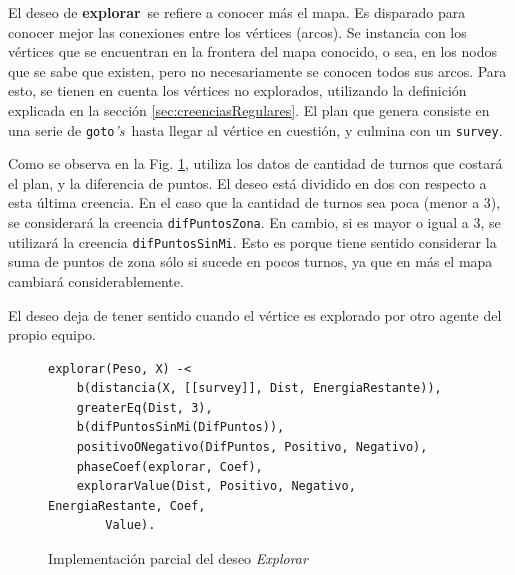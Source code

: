 \documentclass[oneside]{book}
\theoremstyle{definition}
\theoremstyle{example}
\begin{document}
El deseo de \textbf{explorar}\ se refiere a conocer más el mapa. Es disparado para 
conocer mejor las conexiones entre los vértices (arcos). Se instancia con los vértices
que se encuentran en la frontera del mapa conocido, o sea, en los nodos que se sabe
que existen, pero no necesariamente se conocen todos sus arcos. Para esto, se tienen en 
cuenta los vértices no explorados, utilizando la definición explicada en la 
sección \ref{sec:creenciasRegulares}. El plan que genera 
consiste en una serie de \texttt{goto}\textit{'s}\ hasta llegar al vértice en cuestión, y 
culmina con un \texttt{survey}.



Como se observa en la Fig. \ref{fig:deseoExplorar}, utiliza los datos de cantidad de 
turnos que costará el plan, y la diferencia de puntos.
El deseo está dividido en dos con respecto a esta última creencia. En el caso que la
cantidad de turnos sea poca (menor a 3), se considerará la creencia 
\texttt{difPuntosZona}. En cambio, si es mayor o igual a 3, se utilizará la creencia
\texttt{difPuntosSinMi}. Esto es porque tiene sentido considerar la suma de puntos
de zona sólo si sucede en pocos turnos, ya que en más el mapa cambiará 
considerablemente. 

El deseo deja de tener sentido cuando el vértice es explorado por otro agente del propio
equipo. 

\begin{figure}
\begin{verbatim}
explorar(Peso, X) -<
    b(distancia(X, [[survey]], Dist, EnergiaRestante)),
    greaterEq(Dist, 3),
    b(difPuntosSinMi(DifPuntos)),
    positivoONegativo(DifPuntos, Positivo, Negativo),
    phaseCoef(explorar, Coef),
    explorarValue(Dist, Positivo, Negativo, EnergiaRestante, Coef,
    	Value).
\end{verbatim}
\caption{Implementación parcial del deseo \emph{Explorar}}
\label{fig:deseoExplorar}
\end{figure}
% 
\end{document}
